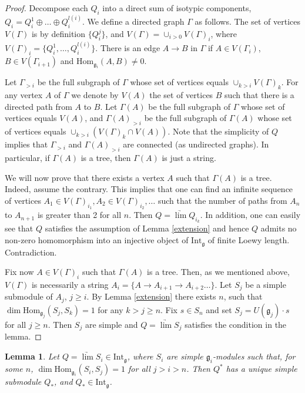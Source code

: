 \documentclass{birkmult}
\newcounter{theorem}
\newtheorem{lemma}[theo]{Lemma}
\renewcommand{\gg}{\mathfrak{g}}
\newcommand{\Int}{\mathrm{Int}}
\renewcommand{\hom}{\mathrm{Hom}}
\begin{document}
\begin{proof} Decompose each $Q_i$ into a
direct sum of isotypic components, $Q_i=Q_i^1\oplus\dots\oplus Q_i^{l(i)}$. 
We define a directed graph $\Gamma$  as follows. The set of
vertices $V(\Gamma)$ is by definition $\{Q_i^j\}$, and
$V(\Gamma)=\cup_{i>0}V(\Gamma)_i$, where
$V(\Gamma)_i=\{Q_i^1,\dots,Q_i^{l(i)}\}$. There is an edge $A\to B$ in
$\Gamma$ if $A\in V(\Gamma_i)$, $B\in V(\Gamma_{i+1})$ and
$\hom_{\gg_i} (A,B)\neq 0$.

Let $\Gamma_{>i}$ be the full subgraph of $\Gamma$ whose set of
vertices equals $\cup_{k>i}V(\Gamma)_k$. For any vertex $A$ of
$\Gamma$ we denote by $V(A)$ the set of vertices $B$ such that
there is a directed path from $A$ to $B$. Let $\Gamma(A)$ be the full
subgraph of $\Gamma$ whose set of vertices equals $V(A)$, and
$\Gamma(A)_{>i}$ be the full subgraph of $\Gamma(A)$ whose set of
vertices equals $\cup_{k>i}(V(\Gamma)_k\cap V(A))$. Note that the
simplicity of $Q$ implies that $\Gamma_{>i}$ and $\Gamma(A)_{>i}$
are connected (as undirected graphs). In particular, if $\Gamma(A)$ is a tree, then
$\Gamma(A)$ is just a string.

We will now prove that there exists a vertex $A$ such that
$\Gamma(A)$ is a tree. Indeed, assume the contrary. This implies
that one can find an infinite sequence of vertices $A_1\in
V(\Gamma)_{i_1},A_2\in V(\Gamma)_{i_2},\dots$ such that the number
of paths from $A_n$ to $A_{n+1}$ is greater than 2 for all $n$.
Then $Q=\underrightarrow{\lim} Q_{i_k}$. In addition, one can
easily see that $Q$ satisfies the assumption of Lemma
\ref{extension} and hence $Q$ admits no non-zero homomorphism into
an injective object of $\Int_\gg$ of finite Loewy length.
Contradiction.

Fix now $A\in V(\Gamma)_i$ such that $\Gamma(A)$ is a tree. Then,
as we mentioned above, $V(\Gamma)$ is necessarily a string
$A_i=\{A\to A_{i+1}\to A_{i+2}\dots\}$. Let $S_j$ be a simple
submodule of $A_j$, $j\geq i$. By Lemma \ref{extension} there
exists $n$, such that $\dim\hom_{\gg_j}(S_j,S_k)=1$ for any
$k>j\geq n$. Fix $s\in S_n$ and set $S_j=U(\gg_j)\cdot s$ for all
$j\geq n$. Then $S_j$ are simple and $Q=\underrightarrow{\lim}
S_j$ satisfies the condition in the lemma. 
\end{proof}
\begin{lemma}\label{unique} Let $Q=\underrightarrow{\lim} S_i\in\Int_\gg$,
where $S_i$ are simple $\gg_i$-modules such that, for some
$n$, $\dim\hom_{\gg_i}(S_i,S_{j})=1$ for all $j>i>n$. Then $Q^*$ has a
unique simple submodule $Q_*$, and $Q_*\in\Int_\gg$.
\end{lemma}
\end{document}
